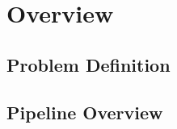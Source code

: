 \chapter{Overview}
\label{chap:overview}

\section{Problem Definition}
\label{sec:problem-definition}

\section{Pipeline Overview}
\label{sec:pipeline-overview}
